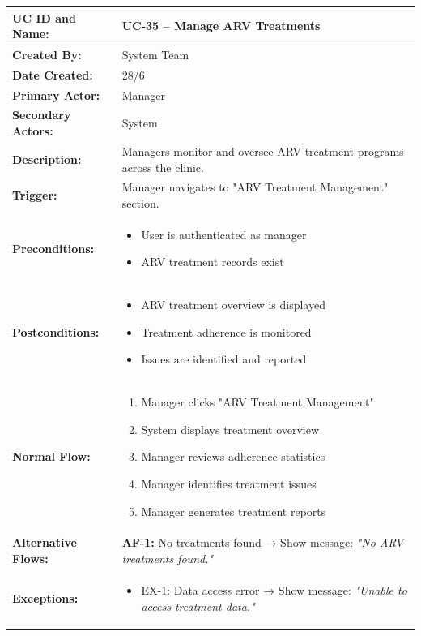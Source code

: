 \documentclass[12pt,a4paper]{article}
\begin{document}
\renewcommand{\arraystretch}{1.5}
\begin{longtable}{|p{4.5cm}|p{10.5cm}|}
\hline
\textbf{UC ID and Name:} & UC-35 – Manage ARV Treatments \\
\hline
\textbf{Created By:} & System Team \\
\hline
\textbf{Date Created:} & 28/6 \\
\hline
\textbf{Primary Actor:} & Manager \\
\hline
\textbf{Secondary Actors:} & System \\
\hline
\textbf{Description:} & Managers monitor and oversee ARV treatment programs across the clinic. \\
\hline
\textbf{Trigger:} & Manager navigates to "ARV Treatment Management" section. \\
\hline
\textbf{Preconditions:} &
\begin{itemize}
  \item User is authenticated as manager
  \item ARV treatment records exist
\end{itemize} \\
\hline
\textbf{Postconditions:} &
\begin{itemize}
  \item ARV treatment overview is displayed
  \item Treatment adherence is monitored
  \item Issues are identified and reported
\end{itemize} \\
\hline
\textbf{Normal Flow:} &
\begin{enumerate}
  \item Manager clicks "ARV Treatment Management"
  \item System displays treatment overview
  \item Manager reviews adherence statistics
  \item Manager identifies treatment issues
  \item Manager generates treatment reports
\end{enumerate} \\
\hline
\textbf{Alternative Flows:} &
\textbf{AF-1:} No treatments found → Show message: \textit{"No ARV treatments found."} \\
\hline
\textbf{Exceptions:} &
\begin{itemize}
  \item EX-1: Data access error → Show message: \textit{"Unable to access treatment data."}

\end{itemize}
\end{longtable}
\end{document}
